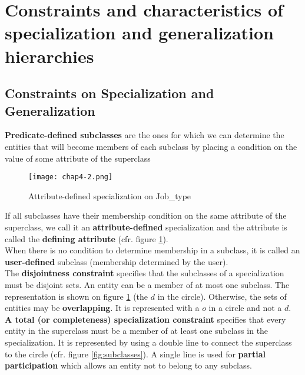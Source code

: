 \section{Constraints and characteristics of specialization and generalization hierarchies}

\subsection{Constraints on Specialization and Generalization}

\textbf{Predicate-defined subclasses} are the ones for which we can determine the entities that will become members of each subclass by placing a condition on the value of some attribute of the superclass\\

\begin{figure}[!h]
    \centering
    \texttt{[image: chap4-2.png]}
    \caption{Attribute-defined specialization on Job\_type}
    \label{fig:predicate}
\end{figure}

If all subclasses have their membership condition on the same attribute of the superclass, we call it an \textbf{attribute-defined} specialization and the attribute is called the \textbf{defining attribute} (cfr. figure \ref{fig:predicate}).\\

When there is no condition to determine membership in a subclass, it is called an \textbf{user-defined} subclass (membership determined by the user).\\

The \textbf{disjointness constraint} specifies that the subclasses of a specialization must be disjoint sets. An entity can be a member of at most one subclass. The representation is shown on figure \ref{fig:predicate} (the $d$ in the circle). Otherwise, the sets of entities may be \textbf{overlapping}. It is represented with a $o$ in a circle and not a $d$.\\

\textbf{A total (or completeness) specialization constraint} specifies that every entity in the superclass must be a member of at least one subclass in the specialization. It is represented by using a double line to connect the superclass to the circle (cfr. figure \ref{fig:subclasses}). A single line is used for \textbf{partial participation} which allows an entity not to belong to any subclass.\\

